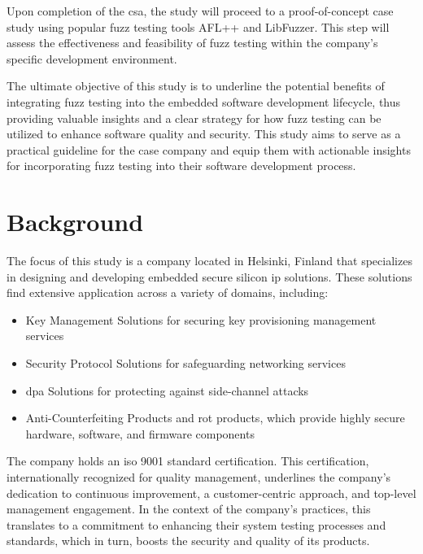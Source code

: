 Upon completion of the \acrshort{csa}, the study will proceed to a proof-of-concept case
study using popular fuzz testing tools AFL++\cite{257204} and
LibFuzzer\cite{libFuzze17:online}.
This step will assess the effectiveness and feasibility of fuzz testing within
the company's specific development environment.

The ultimate objective of this study is to underline the potential benefits of
integrating fuzz testing into the embedded software development lifecycle, thus
providing valuable insights and a clear strategy for how fuzz testing can be
utilized to enhance software quality and security. This study aims to serve as
a practical guideline for the case company and equip them with actionable
insights for incorporating fuzz testing into their software development process.

\section{Background}

The focus of this study is a company located in Helsinki, Finland that specializes in designing
and developing embedded secure silicon \acrlong{ip} solutions\cite{Whatisan76:online}.
These solutions find extensive application across a variety of domains, including:

\begin{itemize}
\item Key Management Solutions\cite{WhatisKe81:online} for securing key provisioning
      management\cite{WhatisPr3:online} services
\item Security Protocol Solutions\cite{TypesofS33:online} for safeguarding
      networking services\cite{kwon2014drives}
\item \gls{dpa} Solutions\cite{Differen58:online}\cite{SIDECHAN21:online} for
      protecting against side-channel attacks\cite{SIDECHAN21:online}\cite{standaert2010introduction}
\item Anti-Counterfeiting Products\cite{PuttingA14:online} and \gls{rot}\cite{WhatisRo39:online} products,
      which provide highly secure hardware\cite{WhatisHa66:online}, software, and firmware\cite{WhatIsFi49:online} components
\end{itemize}

The company holds an \acrlong{iso} 9001 standard\cite{ISOISO9044:online} certification.
This certification, internationally recognized for quality management,
underlines the company's dedication to continuous improvement,
a customer-centric approach, and top-level management engagement.
In the context of the company's practices, this translates to a
commitment to enhancing their system testing processes and standards, which in turn,
boosts the security and quality of its products.

